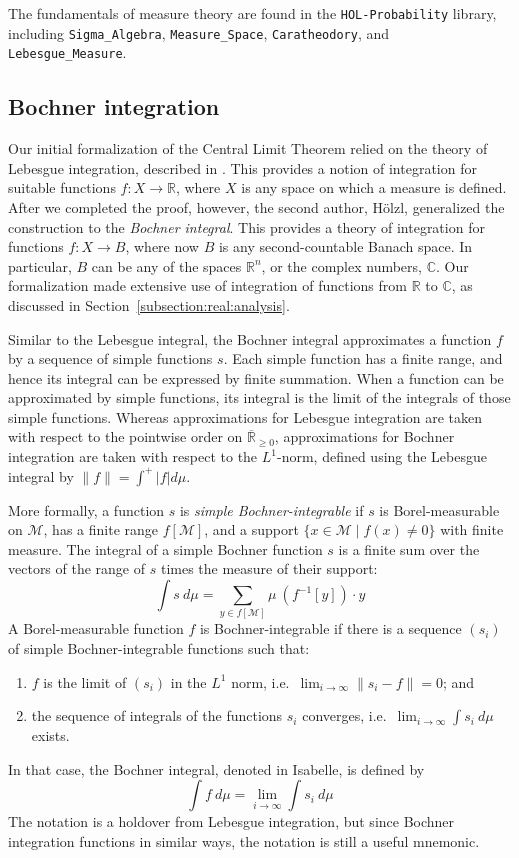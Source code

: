 \documentclass{svjour3}
\newcommand{\RR}{\mathbb{R}}
\newcommand{\CC}{\mathbb{C}}
\newcommand{\ennRR}{\overline{\mathbb{R}}_{\ge 0}}
\newcommand{\mdl}[1]{{\mathcal #1}} %
\begin{document}
The fundamentals of measure theory are found in the \texttt{HOL-Probability} library, including \texttt{Sigma\_Algebra}, \texttt{Measure\_Space}, \texttt{Caratheodory}, and \texttt{Lebesgue\_Measure}.

\subsection{Bochner integration}
\label{subsection:bochner}

Our initial formalization of the Central Limit Theorem relied on the theory of Lebesgue integration, described in \cite{hoelzl:heller:11}. This provides a notion of integration for suitable functions $f : X \to \RR$, where $X$ is any space on which a measure is defined. After we completed the proof, however, the second author, H\"olzl, generalized the construction to the \emph{Bochner integral}. This provides a theory of integration for functions $f : X \to B$, where now $B$ is any second-countable Banach space. In particular, $B$ can be any of the spaces $\RR^n$, or the complex numbers, $\CC$. Our formalization made extensive use of integration of functions from $\RR$ to $\CC$, as discussed in Section~\ref{subsection:real:analysis}.

Similar to the Lebesgue integral, the Bochner integral approximates a function $f$ by a sequence of simple functions $s$. Each simple function has a finite range, and hence its integral can be expressed by finite summation. When a function can be approximated by simple functions, its  integral is the limit of the integrals of those simple functions. Whereas approximations for Lebesgue integration are taken with respect to the pointwise order on $\ennRR$, approximations for Bochner integration are taken with respect to the $L^1$-norm, defined using the Lebesgue integral by $\lVert f \rVert = \int^+ |f| d\mu$.

More formally, a function $s$ is \emph{simple Bochner-integrable} if $s$ is Borel-measurable on $\mdl M$, has a finite range $f[\mdl M]$, and a support $\{x \in \mdl M \mid f(x) \not= 0\}$ with finite measure. The integral of a simple Bochner function $s$ is a finite sum over the vectors of the range of $s$ times the measure of their support:
\[ \int s~d\mu = \sum_{ y \in f[\mdl M]} \mu~(f^{-1}[y]) \cdot y\]
A Borel-measurable function $f$ is Bochner-integrable if there is a sequence $(s_i)$ of simple Bochner-integrable functions such that:
\begin{enumerate}
 \item $f$ is the limit of $(s_i)$ in the $L^1$ norm, i.e.~$\lim_{i \rightarrow \infty} \lVert s_i - f \rVert = 0$; and
 \item the sequence of integrals of the functions $s_i$ converges, i.e.~$\lim_{i \rightarrow \infty} \int s_i ~d\mu$ exists.
\end{enumerate}
In that case, the Bochner integral, denoted  in Isabelle, is defined by
\[ \int f~d\mu = \lim_{i \rightarrow \infty} \int s_i ~d\mu \]
The notation  is a holdover from Lebesgue integration, but since Bochner integration functions in similar ways, the notation is still a useful mnemonic.
\end{document}

